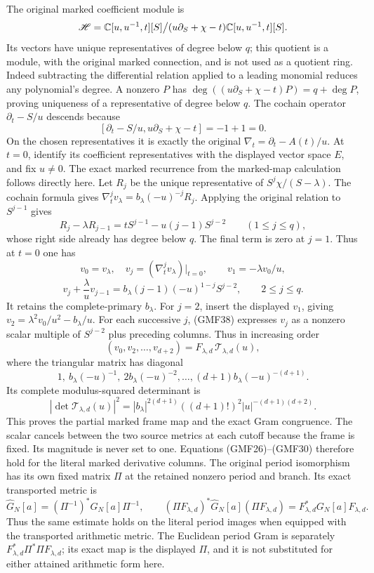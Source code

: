 The original marked coefficient module is
\[
 \mathscr H=\mathbb C[u,u^{-1},t][S]\big/
       (u\partial_S+\chi-t)\mathbb C[u,u^{-1},t][S].
\]
Its vectors have unique representatives of degree below
\(q\); this quotient is a module, with the original marked
connection, and is not used as a quotient ring.
Indeed subtracting the differential relation applied to
a leading monomial reduces any polynomial's degree.
A nonzero \(P\) has
\(\deg((u\partial_S+\chi-t)P)=q+\deg P\), proving
uniqueness of a representative of degree below \(q\).
The cochain operator \(\partial_t-S/u\) descends because
\[
 [\partial_t-S/u,u\partial_S+\chi-t]=-1+1=0.
\]
On the chosen representatives it is exactly the original
\(\nabla_t=\partial_t-A(t)/u\).
At \(t=0\), identify its coefficient representatives with
the displayed vector space \(E\), and fix \(u\ne0\).
The exact marked recurrence from the marked-map
calculation \cite{a02gmf:markedProvider} follows directly here.
Let \(R_j\) be the unique representative of
\(S^j\chi/(S-\lambda)\).  The cochain formula gives
\(\nabla_t^jv_\lambda=b_\lambda(-u)^{-j}R_j\).
Applying the original relation to \(S^{j-1}\) gives
\[
 R_j-\lambda R_{j-1}
   =tS^{j-1}-u(j-1)S^{j-2}\qquad(1\le j\le q),
\]
whose right side already has degree below \(q\).
The final term is zero at \(j=1\).
Thus at \(t=0\) one has
\[
 v_0=v_\lambda,\quad v_j=(\nabla_t^j v_\lambda)|_{t=0},
 \qquad v_1=-\lambda v_0/u,
\]
\begin{equation}\tag{GMF38}
 v_j+\frac{\lambda}{u}v_{j-1}
   =b_\lambda(j-1)(-u)^{1-j}S^{j-2},
                    \qquad 2\le j\le q.
\end{equation}
It retains the complete-primary \(b_\lambda\).
For \(j=2\), insert the displayed \(v_1\), giving
\(v_2=\lambda^2v_0/u^2-b_\lambda/u\).
For each successive \(j\), (GMF38) expresses \(v_j\)
as a nonzero scalar multiple of \(S^{j-2}\) plus preceding
columns.  Thus in increasing order
\[
 (v_0,v_2,\ldots,v_{d+2})
       =F_{\lambda,d}\,\mathcal T_{\lambda,d}(u),
\]
where the triangular matrix has diagonal
\[
 1,\ b_\lambda(-u)^{-1},\
 2b_\lambda(-u)^{-2},\ldots,
 (d+1)b_\lambda(-u)^{-(d+1)}.
\]
Its complete modulus-squared determinant is
\begin{equation}\tag{GMF39}
 |\det\mathcal T_{\lambda,d}(u)|^2
 =|b_\lambda|^{2(d+1)}((d+1)!)^2
                        |u|^{-(d+1)(d+2)}.
\end{equation}
This proves the partial marked frame map and the exact
Gram congruence.  The scalar cancels between the two source
metrics at each cutoff because the frame is fixed.
Its magnitude is never set to one.  Equations (GMF26)--(GMF30)
therefore hold for the literal marked derivative columns.
The original period isomorphism has its own fixed matrix
\(\Pi\) at the retained nonzero period and branch.  Its exact
transported metric is
\[
 \widehat G_N[a]=(\Pi^{-1})^*G_N[a]\Pi^{-1},\qquad
 (\Pi F_{\lambda,d})^*\widehat G_N[a](\Pi F_{\lambda,d})
                  =F_{\lambda,d}^*G_N[a]F_{\lambda,d}.
\]
Thus the same estimate holds on the literal period images
when equipped with the transported arithmetic metric.
The Euclidean period Gram is separately
\(F_{\lambda,d}^*\Pi^*\Pi F_{\lambda,d}\);
its exact map is the displayed \(\Pi\), and it is not
substituted for either attained arithmetic form here.

